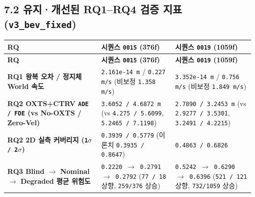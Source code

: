 \documentclass[10.5pt,a4paper]{article}
\begin{document}
\subsection{7.2 유지·개선된 RQ1--RQ4 검증 지표 (\texttt{v3\_\allowbreak{}bev\_\allowbreak{}fixed})}

\begin{footnotesize}
\setlength{\tabcolsep}{4pt}
\setlength{\LTleft}{0pt}\setlength{\LTright}{0pt}
\begin{longtable}{>{\raggedright\arraybackslash}p{} >{\raggedright\arraybackslash}p{} >{\raggedright\arraybackslash}p{}}
\toprule
\textbf{RQ} & \textbf{시퀀스 \texttt{0015} (376f)} & \textbf{시퀀스 \texttt{0019} (1059f)} \\
\midrule
\endfirsthead
\toprule
\textbf{RQ} & \textbf{시퀀스 \texttt{0015} (376f)} & \textbf{시퀀스 \texttt{0019} (1059f)} \\
\midrule
\endhead
\bottomrule
\endfoot
\textbf{RQ1 왕복 오차 / 정지체 World 속도} & \texttt{2.\allowbreak{}161e-\allowbreak{}14 m} / \texttt{0.\allowbreak{}227 m/\allowbreak{}s} (비보정 \texttt{1.\allowbreak{}358 m/\allowbreak{}s}) & \texttt{3.\allowbreak{}352e-\allowbreak{}14 m} / \texttt{0.\allowbreak{}756 m/\allowbreak{}s} (비보정 \texttt{1.\allowbreak{}849 m/\allowbreak{}s}) \\
\textbf{RQ2 OXTS+CTRV \texttt{ADE /\allowbreak{} FDE} (vs No-OXTS / Zero-Vel)} & \texttt{3.\allowbreak{}6052 /\allowbreak{} 4.\allowbreak{}6872 m} (vs \texttt{4.\allowbreak{}275 /\allowbreak{} 5.\allowbreak{}6099}, \texttt{5.\allowbreak{}2465 /\allowbreak{} 7.\allowbreak{}1198}) & \texttt{2.\allowbreak{}7890 /\allowbreak{} 3.\allowbreak{}2453 m} (vs \texttt{2.\allowbreak{}9277 /\allowbreak{} 3.\allowbreak{}5301}, \texttt{3.\allowbreak{}2491 /\allowbreak{} 4.\allowbreak{}2215}) \\
\textbf{RQ2 2D 실측 커버리지 (\texttt{1$\sigma$ /\allowbreak{} 2$\sigma$})} & \texttt{0.\allowbreak{}3939 /\allowbreak{} 0.\allowbreak{}5779} (이론치 \texttt{0.\allowbreak{}3935 /\allowbreak{} 0.\allowbreak{}8647}) & \texttt{0.\allowbreak{}4863 /\allowbreak{} 0.\allowbreak{}6826} \\
\textbf{RQ3 Blind $\rightarrow$ Nominal $\rightarrow$ Degraded 평균 위험도} & \texttt{0.\allowbreak{}2220 $\rightarrow$ 0.\allowbreak{}2791 $\rightarrow$ 0.\allowbreak{}2792} (\texttt{77 /\allowbreak{} 18} 상향, \texttt{259/\allowbreak{}376} 상승) & \texttt{0.\allowbreak{}5242 $\rightarrow$ 0.\allowbreak{}6290 $\rightarrow$ 0.\allowbreak{}6396} (\texttt{521 /\allowbreak{} 121} 상향, \texttt{732/\allowbreak{}1059} 상승) \\

\end{longtable}
\end{footnotesize}
\end{document}
